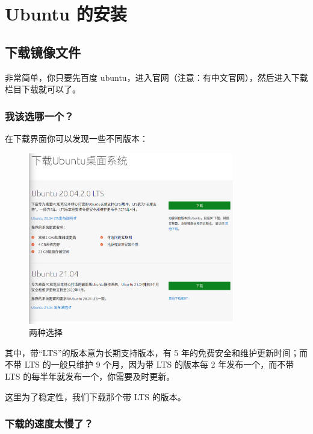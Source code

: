 \documentclass[UTF-8]{ctexart}
\begin{document}
	\newpage
	
	\section{Ubuntu 的安装}
	
		\subsection{下载镜像文件}
		
			非常简单，你只要先百度 ubuntu，进入官网（注意：有中文官网），然后进入下载栏目下载就可以了。
			
			\subsubsection{我该选哪一个？}
			
				在下载界面你可以发现一些不同版本：
				
				\begin{figure}[H]
					\centering
					\includegraphics[width=0.8\textwidth]{fig/download_ubuntu_which.png}
					\caption*{两种选择}
				\end{figure}
			
				其中，带“LTS”的版本意为长期支持版本，有 5 年的免费安全和维护更新时间；而不带 LTS 的一般只维护 9 个月，因为带 LTS 的版本每 2 年发布一个，而不带 LTS 的每半年就发布一个，你需要及时更新。
				
				这里为了稳定性，我们下载那个带 LTS 的版本。
			
			\subsubsection{下载的速度太慢了？}
			
\end{document}
